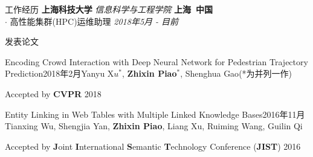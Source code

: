 \documentclass{resume_ch} %
\begin{document}
\begin{rSection}{工作经历}
    {\bf 上海科技大学} {\em 信息科学与工程学院}  \hfill {\bf 上海\ 中国} \\
    $\cdot$ 高性能集群(HPC)运维助理 \hfill {\em 2018年5月 - 目前}

\end{rSection} 



\begin{rSection}{发表论文}
    \begin{pubSubsection}{Encoding Crowd Interaction with Deep Neural Network for Pedestrian Trajectory Prediction}{2018年2月}{Yanyu X$u^*$, \textbf{Zhixin Piao}$^*$, Shenghua Gao}{(*为并列一作)}
        \item Accepted by \textbf{CVPR} 2018
    \end{pubSubsection} 
    \begin{pubSubsection}{Entity Linking in Web Tables with Multiple Linked Knowledge Bases}{2016年11月}{Tianxing Wu, Shengjia Yan, \textbf{Zhixin Piao}, Liang Xu, Ruiming Wang, Guilin Qi}{}
        \item Accepted by \textbf{J}oint \textbf{I}nternational \textbf{S}emantic \textbf{T}echnology Conference (\textbf{JIST}) 2016
    \end{pubSubsection} 
\end{rSection} 
\end{document}
